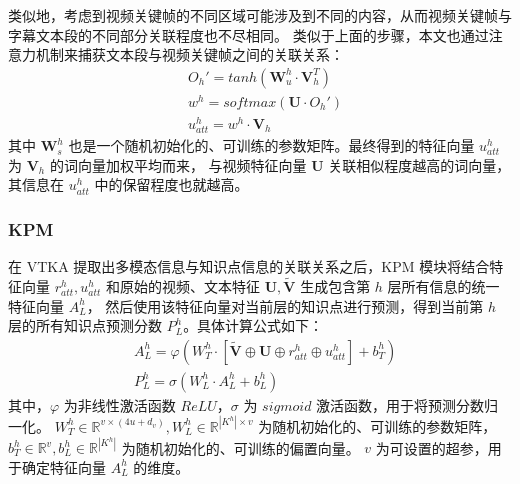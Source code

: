     类似地，考虑到视频关键帧的不同区域可能涉及到不同的内容，从而视频关键帧与字幕文本段的不同部分关联程度也不尽相同。
    类似于上面的步骤，本文也通过注意力机制来捕获文本段与视频关键帧之间的关联关系：
    \begin{equation}
        \begin{aligned}
            &O_h' = tanh\left(\boldsymbol{W}_u^h \cdot \boldsymbol{V}_h^T\right) \\
            &w^h = softmax\left(\boldsymbol{U} \cdot O_h'\right) \\
            &u_{att}^h = w^h \cdot \boldsymbol{V}_h
        \end{aligned}
    \end{equation}
    其中 $\boldsymbol{W}_s^h$ 也是一个随机初始化的、可训练的参数矩阵。最终得到的特征向量 $u_{att}^h$ 为 $\boldsymbol{V}_h$ 的词向量加权平均而来，
    与视频特征向量 $\boldsymbol{U}$ 关联相似程度越高的词向量，其信息在 $u_{att}^h$ 中的保留程度也就越高。

    \subsubsection{KPM}
    在 VTKA 提取出多模态信息与知识点信息的关联关系之后，KPM 模块将结合特征向量 $r_{att}^h, u_{att}^h$ 和原始的视频、文本特征 $\boldsymbol{U}, \boldsymbol{\tilde{V}}$ 生成包含第 $h$ 层所有信息的统一特征向量 $A_L^h$，
    然后使用该特征向量对当前层的知识点进行预测，得到当前第 $h$ 层的所有知识点预测分数 $P_L^h$。具体计算公式如下：
    \begin{equation}
        \begin{aligned}
        &A_L^h = \varphi\left(W_T^h \cdot \left[\boldsymbol{\tilde{V}} \oplus \boldsymbol{U} \oplus r_{att}^h \oplus u_{att}^h\right] + b_T^h\right) \\
        &P_L^h = \sigma\left(W_L^h \cdot A_L^h + b_L^h\right)
        \end{aligned}
    \end{equation}
    其中，$\varphi$ 为非线性激活函数 $ReLU$，$\sigma$ 为 $sigmoid$ 激活函数，用于将预测分数归一化。
    $W_T^h \in \mathbb{R}^{v \times (4u + d_v)}, W_L^h \in \mathbb{R}^{{\left|K^h\right|} \times v}$ 为随机初始化的、可训练的参数矩阵，
    $b_T^h \in \mathbb{R}^{v}, b_L^h \in \mathbb{R}^{\left|K^h\right|}$ 为随机初始化的、可训练的偏置向量。
    $v$ 为可设置的超参，用于确定特征向量 $A_L^h$ 的维度。

